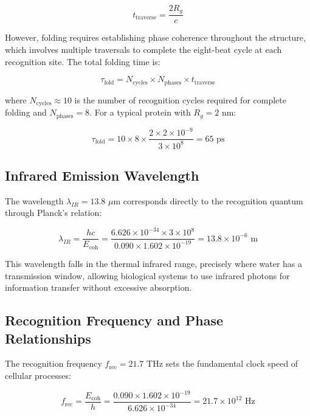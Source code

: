 \documentclass[12pt,a4paper]{report}
\begin{document}
\begin{equation}
t_{\text{traverse}} = \frac{2R_g}{c}
\end{equation}

However, folding requires establishing phase coherence throughout the structure, which involves multiple traversals to complete the eight-beat cycle at each recognition site. The total folding time is:

\begin{equation}
\tau_{\text{fold}} = N_{\text{cycles}} \times N_{\text{phases}} \times t_{\text{traverse}}
\end{equation}

where $N_{\text{cycles}} \approx 10$ is the number of recognition cycles required for complete folding and $N_{\text{phases}} = 8$. For a typical protein with $R_g = 2$ nm:

\begin{equation}
\tau_{\text{fold}} = 10 \times 8 \times \frac{2 \times 2 \times 10^{-9}}{3 \times 10^8} = 65 \text{ ps}
\end{equation}

\subsection{Infrared Emission Wavelength}

The wavelength $\lambda_{IR} = 13.8$ $\mu$m corresponds directly to the recognition quantum through Planck's relation:

\begin{equation}
\lambda_{IR} = \frac{hc}{E_{\text{coh}}} = \frac{6.626 \times 10^{-34} \times 3 \times 10^8}{0.090 \times 1.602 \times 10^{-19}} = 13.8 \times 10^{-6} \text{ m}
\end{equation}

This wavelength falls in the thermal infrared range, precisely where water has a transmission window, allowing biological systems to use infrared photons for information transfer without excessive absorption.

\subsection{Recognition Frequency and Phase Relationships}

The recognition frequency $f_{\text{rec}} = 21.7$ THz sets the fundamental clock speed of cellular processes:

\begin{equation}
f_{\text{rec}} = \frac{E_{\text{coh}}}{h} = \frac{0.090 \times 1.602 \times 10^{-19}}{6.626 \times 10^{-34}} = 21.7 \times 10^{12} \text{ Hz}
\end{equation}
\end{document}
